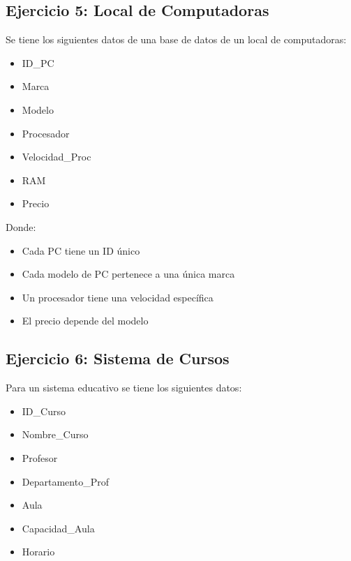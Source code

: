 \documentclass[12pt]{article}
\begin{document}
\subsection{Ejercicio 5: Local de Computadoras}
Se tiene los siguientes datos de una base de datos de un local de computadoras:

\vspace{0.5em}

\begin{minipage}[t]{0.48\textwidth}
\begin{itemize}
    \item ID\_PC
    \item Marca
    \item Modelo
    \item Procesador
\end{itemize}
\end{minipage}
\begin{minipage}[t]{0.48\textwidth}
\begin{itemize}
    \item Velocidad\_Proc
    \item RAM
    \item Precio
\end{itemize}
\end{minipage}

\vspace{1em}

Donde:
\begin{itemize}
    \item Cada PC tiene un ID único
    \item Cada modelo de PC pertenece a una única marca
    \item Un procesador tiene una velocidad específica
    \item El precio depende del modelo
\end{itemize}

\subsection{Ejercicio 6: Sistema de Cursos}
Para un sistema educativo se tiene los siguientes datos:
\vspace{0.5em}

\begin{minipage}[t]{0.48\textwidth}
\begin{itemize}
    \item ID\_Curso 
    \item Nombre\_Curso
    \item Profesor
    \item Departamento\_Prof
\end{itemize}
\end{minipage}
\hfill
\begin{minipage}[t]{0.48\textwidth}
\begin{itemize}
    \item Aula
    \item Capacidad\_Aula
    \item Horario
\end{itemize}
\end{minipage}
\end{document}
